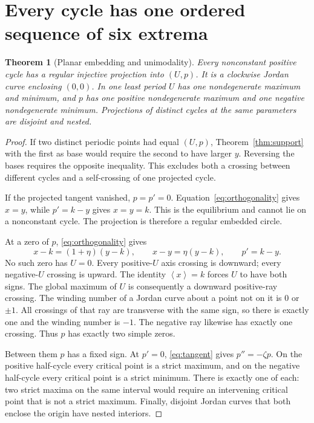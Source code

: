 \documentclass[11pt,a4paper]{article}
\numberwithin{equation}{section}
\newtheorem{theorem}{Theorem}[section]
\theoremstyle{remark}\newtheorem{remark}[theorem]{Remark}
\newcommand{\avg}[1]{\left\langle #1\right\rangle}
\begin{document}
\section{Every cycle has one ordered sequence of six extrema}\label{sec:geometry}
\begin{theorem}[Planar embedding and unimodality]\label{thm:geometry}
Every nonconstant positive cycle has a regular injective projection into $(U,p)$. It is a clockwise Jordan curve enclosing $(0,0)$. In one least period $U$ has one nondegenerate maximum and minimum, and $p$ has one positive nondegenerate maximum and one negative nondegenerate minimum. Projections of distinct cycles at the same parameters are disjoint and nested.
\end{theorem}
\begin{proof}
If two distinct periodic points had equal $(U,p)$, Theorem~\ref{thm:support} with the first as base would require the second to have larger $y$. Reversing the bases requires the opposite inequality. This excludes both a crossing between different cycles and a self-crossing of one projected cycle.

If the projected tangent vanished, $p=p'=0$. Equation~\eqref{eq:orthogonality} gives $x=y$, while $p'=k-y$ gives $x=y=k$. This is the equilibrium and cannot lie on a nonconstant cycle. The projection is therefore a regular embedded circle.

At a zero of $p$, \eqref{eq:orthogonality} gives
\begin{equation}\label{eq:crestidentities}
x-k=(1+\eta)(y-k),\qquad x-y=\eta(y-k),\qquad p'=k-y.
\end{equation}
No such zero has $U=0$. Every positive-$U$ axis crossing is downward; every negative-$U$ crossing is upward. The identity $\avg x=k$ forces $U$ to have both signs. The global maximum of $U$ is consequently a downward positive-ray crossing. The winding number of a Jordan curve about a point not on it is $0$ or $\pm1$. All crossings of that ray are transverse with the same sign, so there is exactly one and the winding number is $-1$. The negative ray likewise has exactly one crossing. Thus $p$ has exactly two simple zeros.

Between them $p$ has a fixed sign. At $p'=0$, \eqref{eq:tangent} gives $p''=-\zeta p$. On the positive half-cycle every critical point is a strict maximum, and on the negative half-cycle every critical point is a strict minimum. There is exactly one of each: two strict maxima on the same interval would require an intervening critical point that is not a strict maximum. Finally, disjoint Jordan curves that both enclose the origin have nested interiors.
\end{proof}
\end{document}
